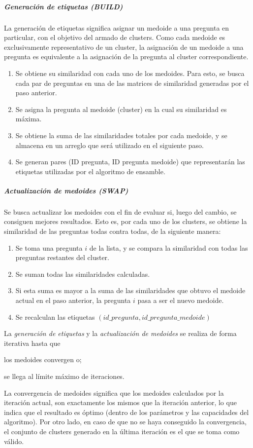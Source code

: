 \subparagraph{Generación de etiquetas (BUILD)}
La generación de etiquetas significa asignar un medoide a una pregunta en particular, con el objetivo del armado de clusters. Como cada medoide es exclusivamente representativo de un cluster, la asignación de un medoide a una pregunta es equivalente a la asignación de la pregunta al cluster correspondiente.
\begin{enumerate}
	\item Se obtiene su similaridad con cada uno de los medoides. Para esto, se busca cada par de preguntas en una de las matrices de similaridad generadas por el paso anterior.
	\item Se asigna la pregunta al medoide (cluster) en la cual su similaridad es máxima.
	\item Se obtiene la suma de las similaridades totales por cada medoide, y se almacena en un arreglo que será utilizado en el siguiente paso.
	\item Se generan pares (ID pregunta, ID pregunta medoide) que representarán las etiquetas utilizadas por el algoritmo de ensamble.
\end{enumerate}

\subparagraph{Actualización de medoides (SWAP)}
Se busca actualizar los medoides con el fin de evaluar si, luego del cambio, se consiguen mejores resultados. Esto es, por cada uno de los clusters, se obtiene la similaridad de las preguntas todas contra todas, de la siguiente manera:

\begin{enumerate}
	\item Se toma una pregunta \(i\) de la lista, y se compara la similaridad con todas las preguntas restantes del cluster.
	\item Se suman todas las similaridades calculadas.
	\item Si esta suma es mayor a la suma de las similaridades que obtuvo el medoide actual en el paso anterior, la pregunta \(i\) pasa a ser el nuevo medoide.
	\item Se recalculan las etiquetas \((id\_pregunta, id\_pregunta\_medoide)\)
\end{enumerate}

La \textit{generación de etiquetas} y la \textit{actualización de medoides} se realiza de forma iterativa hasta que \begin{enumerate*} [label=(\roman*)] \item los medoides convergen o; \item se llega al límite máximo de iteraciones.\end{enumerate*} La convergencia de medoides significa que los medoides calculados por la iteración actual, son exactamente los mismos que la iteración anterior, lo que indica que el resultado es óptimo (dentro de los parámetros y las capacidades del algoritmo). Por otro lado, en caso de que no se haya conseguido la convergencia, el conjunto de clusters generado en la última iteración es el que se toma como válido.

